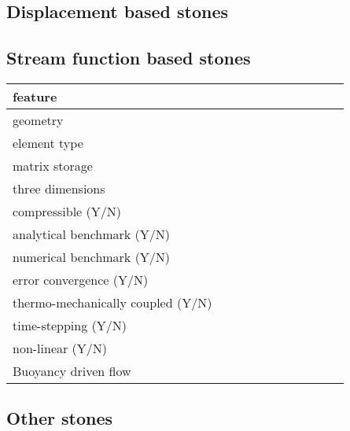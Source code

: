 \begin{landscape}
\subsection{Displacement based stones}

\subsection{Stream function based stones}

\noindent 
{\scriptsize
\begin{tabular}{|l|p{1.5cm}|p{1.5cm}|p{1.5cm}|p{1.5cm}|p{1.5cm}|p{1.5cm}|p{1.5cm}|p{1.5cm}|p{1.5cm}|p{1.5cm}|} 
\hline
feature & &&&&&&&&& \\ 
\hline
geometry &  &&&&&&&&& \\
element type &&&&&&&&&\\ 
matrix storage & & &&&&&&&& \\
\hline
three dimensions &  &&&&&&&&& \\
compressible (Y/N) &&&&&&&&&& \\
analytical benchmark (Y/N) &&&&&&&&&& \\
numerical benchmark (Y/N) &  &&&&&&&&& \\
error convergence (Y/N) & &&&&&&&&& \\
thermo-mechanically coupled (Y/N) &&&&&&&&&& \\
time-stepping (Y/N) &&&&&&&&&& \\
non-linear (Y/N) &&&&&&&&&& \\
Buoyancy driven flow & &  &&&&&&&\\
\hline
\end{tabular}
}







\subsection{Other stones}


\end{landscape}
